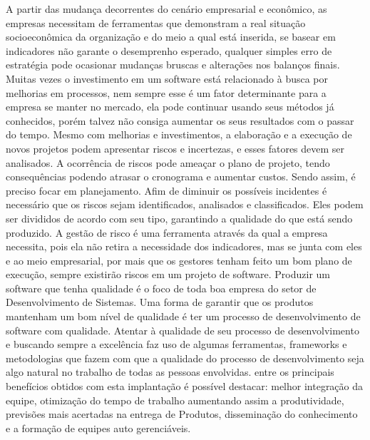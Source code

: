 \documentclass[12pt]{article}
\begin{document}
        A partir das mudança decorrentes do cenário empresarial e econômico, as empresas necessitam de ferramentas que  demonstram a real situação socioeconômica da organização e do meio a qual está inserida, se basear em indicadores não garante o desemprenho esperado, qualquer simples erro de estratégia pode ocasionar mudanças bruscas e alterações nos balanços finais.
        Muitas vezes o investimento em um software está relacionado à busca por melhorias em processos, nem sempre esse é um fator determinante para a empresa se manter no mercado, ela pode continuar usando seus métodos já conhecidos, porém talvez não consiga aumentar os seus resultados com o passar do tempo.
        Mesmo com melhorias e investimentos, a elaboração e a execução de novos projetos podem apresentar riscos e incertezas, e esses fatores devem ser analisados. A ocorrência de riscos pode ameaçar o plano de projeto, tendo consequências podendo atrasar o cronograma e aumentar custos. Sendo assim, é preciso focar em planejamento.
        Afim de diminuir os possíveis incidentes é necessário que os riscos sejam identificados, analisados e classificados. Eles podem ser divididos de acordo com seu tipo, garantindo a qualidade do que está sendo produzido.
        A gestão de risco é uma ferramenta através da qual a empresa necessita, pois ela não retira a necessidade dos indicadores, mas se junta com eles e ao meio empresarial, por mais que os gestores tenham feito um bom plano de execução, sempre existirão riscos em um projeto de software.
        Produzir um software que tenha qualidade é o foco de toda boa empresa do setor de Desenvolvimento de Sistemas.
        Uma forma de garantir que os produtos mantenham um bom nível de qualidade é ter um processo de desenvolvimento de software com qualidade.
        Atentar à qualidade de seu processo de desenvolvimento e buscando sempre a excelência faz uso de algumas ferramentas,
        frameworks e metodologias que fazem com que a qualidade do processo de desenvolvimento seja algo natural no trabalho de todas as pessoas envolvidas.
        entre os principais benefícios obtidos com esta implantação é possível destacar: melhor integração da equipe, 
        otimização do tempo de trabalho aumentando assim a produtividade, previsões mais acertadas na entrega de Produtos, disseminação do conhecimento e a formação de equipes auto gerenciáveis.
        
    \nocite{*}
    
    
\end{document}
